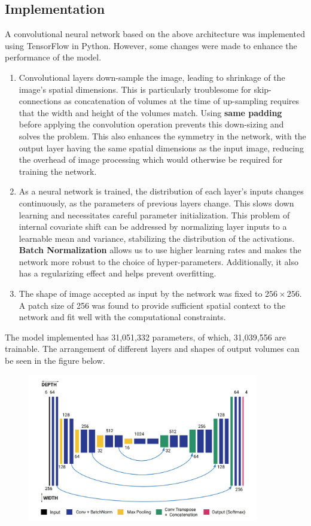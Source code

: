 \documentclass[12pt, a4paper]{report}
\begin{document}
\subsection{Implementation}
A convolutional neural network based on the above architecture was implemented using TensorFlow in Python. However, some changes were made to enhance the performance of the model.
\begin{enumerate}
\item Convolutional layers down-sample the image, leading to shrinkage of the image's spatial dimensions. This is particularly troublesome for skip-connections as concatenation of volumes at the time of up-sampling requires that the width and height of the volumes match. Using \textbf{same padding} before applying the convolution operation prevents this down-sizing and solves the problem. This also enhances the symmetry in the network, with the output layer having the same spatial dimensions as the input image, reducing the overhead of image processing which would otherwise be required for training the network. 
\item As a neural network is trained, the distribution of each layer's inputs changes continuously, as the parameters of previous layers change. This slows down learning and necessitates careful parameter initialization. This problem of internal covariate shift can be addressed by normalizing layer inputs to a learnable mean and variance, stabilizing the distribution of the activations. \textbf{Batch Normalization} allows us to use higher learning rates and makes the network more robust to the choice of hyper-parameters. Additionally, it also has a regularizing effect and helps prevent overfitting.
\item The shape of image accepted as input by the network was fixed to $256 \times 256$. A patch size of 256 was found to provide sufficient spatial context to the network and fit well with the computational constraints.
\end{enumerate}
The model implemented has 31,051,332 parameters, of which, 31,039,556 are trainable. The arrangement of different layers and shapes of output volumes can be seen in the figure below.
\begin{figure}[h]
\centering
\includegraphics[width=0.9\textwidth]{cnn_implement.jpg}
\end{figure}
\end{document}
